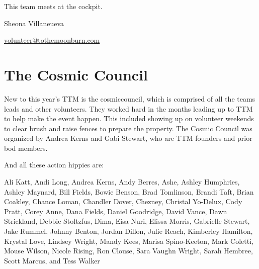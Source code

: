 This team meets at the \gls{cockpit}.

\begin{description}[leftmargin=6em,noitemsep,style=nextline]
   \item[Lead:] Sheona Villaneueva
   \item[Co-leads:] 
   \item[Contact:] \url{volunteer@tothemoonburn.com}
\end{description}

\section*{The Cosmic Council}

New to this year's TTM is the \gls{cosmiccouncil}, which is comprised of all the teams leads and other volunteers.  They worked hard in the months leading up to TTM to help make the event happen.  This included showing up on volunteer weekends to clear brush and raise fences to prepare the property.  The Cosmic Council was organized by Andrea Kerns and Gabi Stewart, who are TTM founders and prior \gls{bod} members.

And all these action hippies are: 

\vspace{1cm}

\shapepar{\heartshape}
Ali Katt,
Andi Long,
Andrea Kerns, 
Andy Berres,
Ashe,
Ashley Humphries,
Ashley Maynard,
Bill Fields,
Bowie Benson,
Brad Tomlinson,
Brandi Taft,
Brian Coakley,
Chance Loman,
Chandler Dover,
Chezney,
Christal Yo-Delux,
Cody Pratt,
Corey Anne,
Dana Fields,
Daniel Goodridge,
David Vance,
Dawn Strickland,
Debbie Stoltzfus,
Dima,
Eisa Nuri,
Elissa Morris,
Gabrielle Stewart,
Jake Rummel,
Johnny Benton,
Jordan Dillon,
Julie Reach,
Kimberley Hamilton,
Krystal Love,
Lindsey Wright,
Mandy Kees,
Marisa Spino-Keeton,
Mark Coletti,
Mouse Wilson,
Nicole Rising,
Ron Clouse,
Sara Vaughn Wright,
Sarah Hembree,
Scott Marcus, and
Tess Walker


